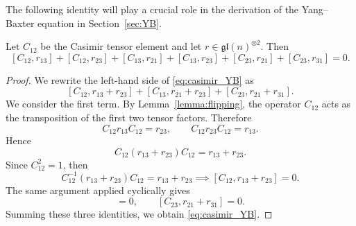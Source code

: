 The following identity will play a crucial role in the derivation of the Yang--Baxter equation in Section~\ref{sec:YB}.
\begin{proposition}\label{prop:casimir_r_relation}
    Let $C_{12}$ be the Casimir tensor element and let $r \in \mathfrak{gl}(n)^{\otimes 2}$. Then
    \begin{equation}\label{eq:casimir_YB}
        [C_{12},r_{13}] + [C_{12},r_{23}]
        + [C_{13},r_{21}] + [C_{13},r_{23}]
        + [C_{23},r_{21}] + [C_{23},r_{31}] = 0.
    \end{equation}
\end{proposition}
\begin{proof}
    We rewrite the left-hand side of \eqref{eq:casimir_YB} as
    \begin{equation}\label{eq:casimir_accorpati}
        [C_{12}, r_{13} + r_{23}]
        + [C_{13}, r_{21} + r_{23}]
        + [C_{23}, r_{21} + r_{31}].
    \end{equation}
    We consider the first term. By Lemma~\ref{lemma:flipping}, the operator $C_{12}$ acts as the transposition of the first two tensor factors. Therefore
    \begin{equation}
        C_{12} r_{13} C_{12} = r_{23},
        \qquad
        C_{12} r_{23} C_{12} = r_{13}.
    \end{equation}
    Hence
    \begin{equation}
        C_{12}(r_{13}+r_{23})C_{12} = r_{13}+r_{23}.
    \end{equation}
    Since $C_{12}^2 = 1$, then
    \begin{equation}
        C_{12}^{-1} (r_{13} + r_{23}) C_{12} = r_{13} + r_{23} \implies [C_{12}, r_{13}+r_{23}] = 0.
    \end{equation}
    The same argument applied cyclically gives
    \begin{equation}
        [C_{13}, r_{21}+r_{23}] = 0,
        \qquad
        [C_{23}, r_{21}+r_{31}] = 0.
    \end{equation}
    Summing these three identities, we obtain \eqref{eq:casimir_YB}.
\end{proof}
